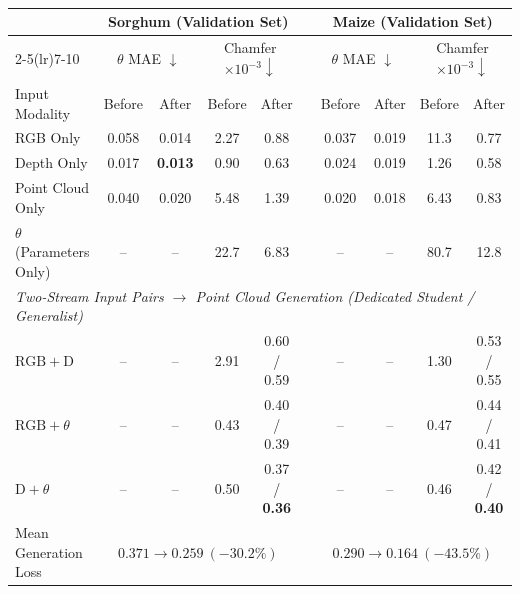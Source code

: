 \begin{table}[t]
  \centering\scriptsize
  \setlength{\tabcolsep}{3.6pt}
  \begin{tabular}{l cc cc c cc cc}
    \toprule
    & \multicolumn{4}{c}{Sorghum (Validation Set)} & & \multicolumn{4}{c}{Maize (Validation Set)} \\
    \cmidrule(lr){2-5}\cmidrule(lr){7-10}
    & \multicolumn{2}{c}{$\theta$ MAE $\downarrow$} & \multicolumn{2}{c}{Chamfer $\times10^{-3}\downarrow$} & & \multicolumn{2}{c}{$\theta$ MAE $\downarrow$} & \multicolumn{2}{c}{Chamfer $\times10^{-3}\downarrow$} \\
    Input Modality & Before & After & Before & After & & Before & After & Before & After \\
    \midrule
    RGB Only & 0.058 & 0.014 & 2.27 & 0.88 & & 0.037 & 0.019 & 11.3 & 0.77 \\
    Depth Only & 0.017 & \textbf{0.013} & 0.90 & 0.63 & & 0.024 & 0.019 & 1.26 & 0.58 \\
    Point Cloud Only & 0.040 & 0.020 & 5.48 & 1.39 & & 0.020 & 0.018 & 6.43 & 0.83 \\
    $\theta$ (Parameters Only) & -- & -- & 22.7 & 6.83 & & -- & -- & 80.7 & 12.8 \\
    \midrule
    \multicolumn{10}{l}{\emph{Two-Stream Input Pairs $\to$ Point Cloud Generation (Dedicated Student / Generalist)}} \\
    $\mathrm{RGB}+\mathrm{D}$ & -- & -- & 2.91 & 0.60 / 0.59 & & -- & -- & 1.30 & 0.53 / 0.55 \\
    $\mathrm{RGB}+\theta$ & -- & -- & 0.43 & 0.40 / 0.39 & & -- & -- & 0.47 & 0.44 / 0.41 \\
    $\mathrm{D}+\theta$ & -- & -- & 0.50 & 0.37 / \textbf{0.36} & & -- & -- & 0.46 & 0.42 / \textbf{0.40} \\
    \midrule
    Mean Generation Loss & \multicolumn{4}{c}{$0.371 \to 0.259\ (-30.2\%)$} & & \multicolumn{4}{c}{$0.290 \to 0.164\ (-43.5\%)$} \\
    \bottomrule
  \end{tabular}
  \caption{}
  \label{tab:anysubset}\label{tab:main}
\end{table}

